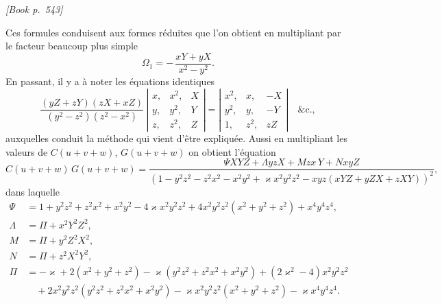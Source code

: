 \documentclass[11pt]{article}
\begin{document}
\medskip
\noindent\textit{[Book p.~543]}\hfill

\smallskip

\noindent Ces formules conduisent aux formes r\'eduites que l'on obtient en multipliant par le facteur beaucoup plus simple
\[
\Omega_{1} = -\,\frac{xY + yX}{x^{2} - y^{2}}.
\]
En passant, il y a \`a noter les \'equations identiques
\[
\frac{(yZ + zY)(zX + xZ)}{(y^{2} - z^{2})(z^{2} - x^{2})}\,\left|\begin{array}{ccc}x, & x^{2}, & X\\ y, & y^{2}, & Y\\ z, & z^{2}, & Z\end{array}\right| = \left|\begin{array}{ccc}x^{2}, & x, & -X\\ y^{2}, & y, & -Y\\ 1, & z^{2}, & zZ\end{array}\right|\quad\&\text{c.},
\]
auxquelles conduit la m\'ethode qui vient d'\^etre expliqu\'ee. Aussi en multipliant les valeurs de $C(u + v + w)$, $G(u + v + w)$ on obtient l'\'equation
\[
C(u + v + w)\,G(u + v + w) = \frac{\Psi XYZ + \Lambda yzX + Mzx\,Y + NxyZ}{(1 - y^{2}z^{2} - z^{2}x^{2} - x^{2}y^{2} + \varkappa x^{2}y^{2}z^{2} - xyz(xYZ + yZX + zXY))^{2}},
\]
dans laquelle
\[
\begin{aligned}
\Psi &= 1 + y^{2}z^{2} + z^{2}x^{2} + x^{2}y^{2} - 4\varkappa x^{2}y^{2}z^{2} + 4x^{2}y^{2}z^{2}(x^{2} + y^{2} + z^{2}) + x^{4}y^{4}z^{4},\\
\Lambda &= \Pi + x^{2}Y^{2}Z^{2},\\
M &= \Pi + y^{2}Z^{2}X^{2},\\
N &= \Pi + z^{2}X^{2}Y^{2},\\
\Pi &= -\varkappa + 2(x^{2} + y^{2} + z^{2}) - \varkappa(y^{2}z^{2} + z^{2}x^{2} + x^{2}y^{2}) + (2\varkappa^{2} - 4)x^{2}y^{2}z^{2}\\
&\quad + 2x^{2}y^{2}z^{2}(y^{2}z^{2} + z^{2}x^{2} + x^{2}y^{2}) - \varkappa x^{2}y^{2}z^{2}(x^{2} + y^{2} + z^{2}) - \varkappa x^{4}y^{4}z^{4}.
\end{aligned}
\]
\end{document}
